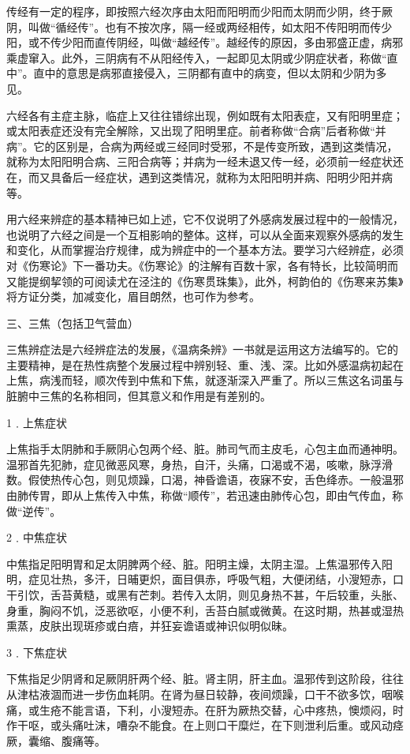 \documentclass[a4paper,12pt,UTF8,twoside]{ctexbook}
\begin{document}
传经有一定的程序，即按照六经次序由太阳而阳明而少阳而太阴而少阴，终于厥阴，叫做“循经传”。也有不按次序，隔一经或两经相传，如太阳不传阳明而传少阳，或不传少阳而直传阴经，叫做“越经传”。越经传的原因，多由邪盛正虚，病邪乘虚窜入。此外，三阴病有不从阳经传入，一起即见太阴或少阴症状者，称做“直中”。直中的意思是病邪直接侵入，三阴都有直中的病变，但以太阴和少阴为多见。

六经各有主症主脉，临症上又往往错综出现，例如既有太阳表症，又有阳明里症；或太阳表症还没有完全解除，又出现了阳明里症。前者称做“合病”后者称做“并病”。它的区别是，合病为两经或三经同时受邪，不是传变所致，遇到这类情况，就称为太阳阳明合病、三阳合病等；并病为一经未退又传一经，必须前一经症状还在，而又具备后一经症状，遇到这类情况，就称为太阳阳明并病、阳明少阳并病等。

用六经来辨症的基本精神已如上述，它不仅说明了外感病发展过程中的一般情况，也说明了六经之间是一个互相影响的整体。这样，可以从全面来观察外感病的发生和变化，从而掌握治疗规律，成为辨症中的一个基本方法。要学习六经辨症，必须对《伤寒论》下一番功夫。《伤寒论》的注解有百数十家，各有特长，比较简明而又能提纲挈领的可阅读尤在泾注的《伤寒贯珠集》，此外，柯韵伯的《伤寒来苏集》将方证分类，加减变化，眉目朗然，也可作为参考。

三、三焦（包括卫气营血）

三焦辨症法是六经辨症法的发展，《温病条辨》一书就是运用这方法编写的。它的主要精神，是在热性病整个发展过程中辨别轻、重、浅、深。比如外感温病初起在上焦，病浅而轻，顺次传到中焦和下焦，就逐渐深入严重了。所以三焦这名词虽与脏腑中三焦的名称相同，但其意义和作用是有差别的。

1﹒上焦症状

上焦指手太阴肺和手厥阴心包两个经、脏。肺司气而主皮毛，心包主血而通神明。温邪首先犯肺，症见微恶风寒，身热，自汗，头痛，口渴或不渴，咳嗽，脉浮滑数。假使热传心包，则见烦躁，口渴，神昏谵语，夜寐不安，舌色绛赤。一般温邪由肺传胃，即从上焦传入中焦，称做“顺传”，若迅速由肺传心包，即由气传血，称做“逆传”。

2﹒中焦症状

中焦指足阳明胃和足太阴脾两个经、脏。阳明主燥，太阴主湿。上焦温邪传入阳明，症见壮热，多汗，日晡更炽，面目俱赤，呼吸气粗，大便闭结，小溲短赤，口干引饮，舌苔黄糙，或黑有芒刺。若传入太阴，则见身热不甚，午后较重，头胀、身重，胸闷不饥，泛恶欲呕，小便不利，舌苔白腻或微黄。在这时期，热甚或湿热熏蒸，皮肤出现斑疹或白㾦，并狂妄谵语或神识似明似昧。

3﹒下焦症状

下焦指足少阴肾和足厥阴肝两个经、脏。肾主阴，肝主血。温邪传到这阶段，往往从津枯液涸而进一步伤血耗阴。在肾为昼日较静，夜间烦躁，口干不欲多饮，咽喉痛，或生疮不能言语，下利，小溲短赤。在肝为厥热交替，心中疼热，懊烦闷，时作干呕，或头痛吐沫，嘈杂不能食。在上则口干糜烂，在下则泄利后重。或风动痉厥，囊缩、腹痛等。
\end{document}
